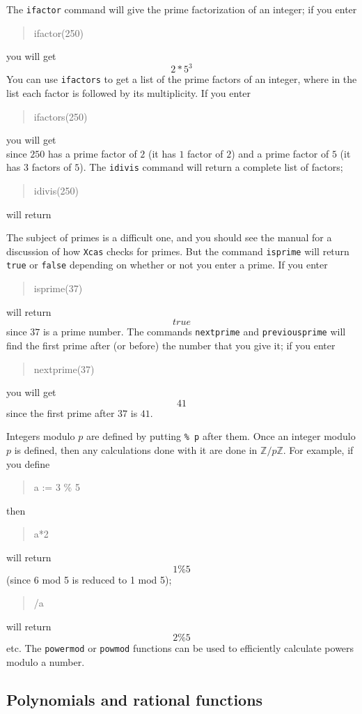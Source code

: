 \documentclass{article}
\newcommand{\Z}{{\mathbb{Z}}}
\newcommand{\xcasin}[1]
{\begin{quote}\ttfamily
#1
\end{quote}}
\newcommand{\xcasout}[1]
{\begin{equation*}
#1
\end{equation*}}
\begin{document}
The \texttt{ifactor} command will give the prime factorization of an
integer; if you enter
\xcasin{ifactor(250)}
you will get
\xcasout{2*5^3}
You can use \texttt{ifactors} to get a list of the prime factors of an
integer, where in the list each factor is followed by its multiplicity.
If you enter
\xcasin{ifactors(250)}
you will get
\xcasout{[2,1,5,3]}
since $250$ has a prime factor of $2$ (it has $1$ factor of $2$) and a
prime factor of $5$ (it has $3$ factors of $5$).
The \texttt{idivis} command will return a complete list of factors;
\xcasin{idivis(250)}
will return
\xcasout{[1,2,5,10,25,50,125,250]}

The subject of primes is a difficult one, and you should see the
manual for a discussion of how \texttt{Xcas} checks for primes.  But
the command \texttt{isprime} will return \texttt{true} or \texttt{false}
depending on whether or not you enter a prime.  If you enter
\xcasin{isprime(37)}
will return
\xcasout{true}
since $37$ is a prime number.  The commands \texttt{nextprime} and
\texttt{previousprime} will find the first prime after (or before) the
number that you give it; if you enter
\xcasin{nextprime(37)}
you will get
\xcasout{41}
since the first prime after $37$ is $41$.

Integers modulo $p$ are defined by putting \texttt{\% p} after them.
Once an integer modulo $p$ is defined, then any calculations done with
it are done in $\Z/p\Z$.  For example, if you define
\xcasin{a := 3 \% 5}
then
\xcasin{a*2}
will return
\xcasout{1 \% 5}
(since 6 mod 5 is reduced to 1 mod 5); 
\xcasin{1/a}
will return
\xcasout{2 \% 5}
etc.  The \texttt{powermod} or \texttt{powmod} functions can be used
to efficiently calculate powers modulo a number.


\subsection{Polynomials and rational functions}
\end{document}
